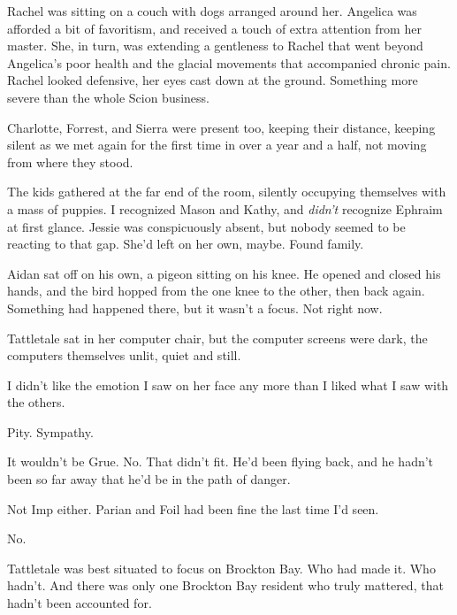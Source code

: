 Rachel was sitting on a couch with dogs arranged around her.  Angelica was afforded a bit of favoritism, and received a touch of extra attention from her master.  She, in turn, was extending a gentleness to Rachel that went beyond Angelica's poor health and the glacial movements that accompanied chronic pain.  Rachel looked defensive, her eyes cast down at the ground.  Something more severe than the whole Scion business.



Charlotte, Forrest, and Sierra were present too, keeping their distance, keeping silent as we met again for the first time in over a year and a half, not moving from where they stood.



The kids gathered at the far end of the room, silently occupying themselves with a mass of puppies.  I recognized Mason and Kathy, and \emph{didn't} recognize Ephraim at first glance.  Jessie was conspicuously absent, but nobody seemed to be reacting to that gap.  She'd left on her own, maybe.  Found family.



Aidan sat off on his own, a pigeon sitting on his knee.  He opened and closed his hands, and the bird hopped from the one knee to the other, then back again.\emph{  }Something had happened there, but it wasn't a focus.  Not right now.



Tattletale sat in her computer chair, but the computer screens were dark, the computers themselves unlit, quiet and still.



I didn't like the emotion I saw on her face any more than I liked what I saw with the others.



Pity.  Sympathy.



It wouldn't be Grue.  No.  That didn't fit.  He'd been flying back, and he hadn't been so far away that he'd be in the path of danger.



Not Imp either.  Parian and Foil had been fine the last time I'd seen.



No.



Tattletale was best situated to focus on Brockton Bay.  Who had made it.  Who hadn't.  And there was only one Brockton Bay resident who truly mattered, that hadn't been accounted for.



